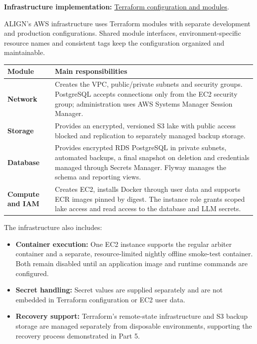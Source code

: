\documentclass[11pt]{article}
\begin{document}
\noindent\textbf{Infrastructure implementation:}
\href{https://github.com/UofT-CSC490-F2026/ALIGN/pull/24}
{Terraform configuration and modules}.

ALIGN's AWS infrastructure uses Terraform modules with separate development and production configurations. Shared module interfaces, environment-specific resource names and consistent tags keep the configuration organized and maintainable.

{\small
\begin{tabularx}{\linewidth}{@{}L{3.2cm}Y@{}}
\toprule
\textbf{Module} & \textbf{Main responsibilities} \\
\midrule
\textbf{Network} & Creates the VPC, public/private subnets and security groups. PostgreSQL accepts connections only from the EC2 security group; administration uses AWS Systems Manager Session Manager. \\
\textbf{Storage} & Provides an encrypted, versioned S3 lake with public access blocked and replication to separately managed backup storage. \\
\textbf{Database} & Provides encrypted RDS PostgreSQL in private subnets, automated backups, a final snapshot on deletion and credentials managed through Secrets Manager. Flyway manages the schema and reporting views. \\
\textbf{Compute and IAM} & Creates EC2, installs Docker through user data and supports ECR images pinned by digest. The instance role grants scoped lake access and read access to the database and LLM secrets. \\
\bottomrule
\end{tabularx}
}

The infrastructure also includes:

\begin{itemize}
  \item \textbf{Container execution:} One EC2 instance supports the regular arbiter container and a separate, resource-limited nightly offline smoke-test container. Both remain disabled until an application image and runtime commands are configured.
  \item \textbf{Secret handling:} Secret values are supplied separately and are not embedded in Terraform configuration or EC2 user data.
  \item \textbf{Recovery support:} Terraform's remote-state infrastructure and S3 backup storage are managed separately from disposable environments, supporting the recovery process demonstrated in Part 5.
\end{itemize}
\end{document}

